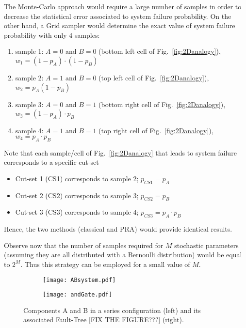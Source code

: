The Monte-Carlo approach would require a large number of samples in order to decrease the statistical error associated
to system failure probability.
On the other hand, a Grid sampler would determine the exact value of system failure probability with only 4 samples:
\begin{enumerate}
  \item sample 1: $A=0$ and $B=0$ (bottom left cell of Fig.~\ref{fig:2Danalogy}), $w_1 = (1-p_A) \cdot (1-p_B)$
  \item sample 2: $A=1$ and $B=0$ (top left cell of Fig.~\ref{fig:2Danalogy}), $w_2 = p_A (1-p_B)$
  \item sample 3: $A=0$ and $B=1$ (bottom right cell of Fig.~\ref{fig:2Danalogy}), $w_3 = (1-p_A) \cdot p_B$
  \item sample 4: $A=1$ and $B=1$ (top right cell of Fig.~\ref{fig:2Danalogy}), $w_4 = p_A \cdot p_B$
\end{enumerate}
Note that each sample/cell of Fig.~\ref{fig:2Danalogy} that leads to system failure corresponds to a specific cut-set
\begin{itemize}
  \item Cut-set 1 (CS1) corresponds to sample 2; $p_{CS1} = p_A$
  \item Cut-set 2 (CS2) corresponds to sample 3; $p_{CS2} = p_B$
  \item Cut-set 3 (CS3) corresponds to sample 4; $p_{CS3} = p_A \cdot p_B$
\end{itemize}
Hence, the two methods (classical and PRA) would provide identical results.

Observe now that the number of samples required for $M$ stochastic parameters (assuming they are all distributed with 
a Bernoulli distribution) would be equal to $2^M$. Thus this strategy can be employed for a small value of $M$.

\begin{figure}
  \centering
  \begin{subfigure}{.5\textwidth}
    \centering
    \texttt{[image: ABsystem.pdf]}
    \label{fig:sub1}
  \end{subfigure}%
  \begin{subfigure}{.5\textwidth}
    \centering
    \texttt{[image: andGate.pdf]}
    \label{fig:ABsystem}
  \end{subfigure}
  \caption{Components A and B in a series configuration (left) and its associated Fault-Tree [FIX THE FIGURE???] (right).}
  \label{fig:ABsystem}
\end{figure}

